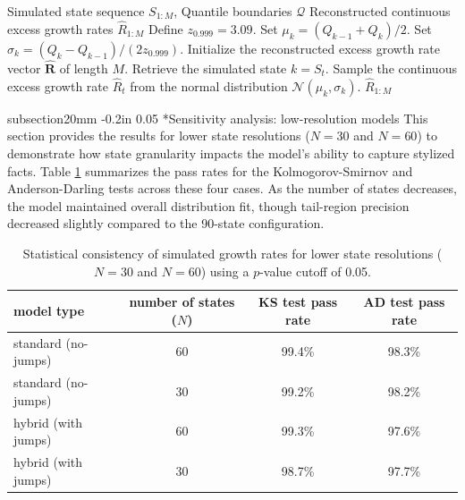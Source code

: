 \documentclass[12pt, letterpaper]{article}
\makeatletter
\renewcommand\section{\@startsection
	{subsection}{2}{0mm}
	{-0.2in}
	{0.05\baselineskip}
	{\normalfont\large\bfseries}}
\makeatother
\begin{document}
\clearpage

\begin{algorithm}[htpb]
\caption{State decoding and continuous excess growth rate reconstruction}
\label{alg:decode}
\begin{algorithmic}[1]
\REQUIRE Simulated state sequence $S_{1:M}$, Quantile boundaries $\mathcal{Q}$
\ENSURE Reconstructed continuous excess growth rates $\hat{R}_{1:M}$
\STATE Define $z_{0.999} = 3.09$.
    \STATE Set $\mu_k = (Q_{k-1} + Q_k)/2$.
    \STATE Set $\sigma_k = (Q_k - Q_{k-1})/(2 z_{0.999})$.
\ENDFOR
\STATE Initialize the reconstructed excess growth rate vector $\mathbf{\hat{R}}$ of length $M$.
    \STATE Retrieve the simulated state $k = S_t$.
\STATE Sample the continuous excess growth rate $\hat{R}_t$ from the normal distribution $\mathcal{N}(\mu_k, \sigma_k)$.
\ENDFOR
\RETURN $\hat{R}_{1:M}$
\end{algorithmic}
\end{algorithm}

\clearpage

\section*{Sensitivity analysis: low-resolution models}\label{app:sensitivity}
This section provides the results for lower state resolutions ($N=30$ and $N=60$) to demonstrate how state granularity impacts the model's ability to capture stylized facts. Table \ref{tab:sensitivity_results} summarizes the pass rates for the Kolmogorov-Smirnov and Anderson-Darling tests across these four cases. As the number of states decreases, the model maintained overall distribution fit, though tail-region precision decreased slightly compared to the 90-state configuration.

\begin{table}[htpb]
\centering
\caption{Statistical consistency of simulated growth rates for lower state resolutions ($N=30$ and $N=60$) using a $p$-value cutoff of 0.05.}
\label{tab:sensitivity_results}
\begin{tabular}{@{}lccc@{}}
\toprule
\textbf{model type} & \textbf{number of states ($N$)} & \textbf{KS test pass rate} & \textbf{AD test pass rate} \\ \midrule
standard (no-jumps) & 60 & 99.4\% & 98.3\% \\
standard (no-jumps) & 30 & 99.2\% & 98.2\% \\ \midrule
hybrid (with jumps) & 60 & 99.3\% & 97.6\% \\
hybrid (with jumps) & 30 & 98.7\% & 97.7\% \\ \bottomrule
\end{tabular}
\end{table}
\end{document}
